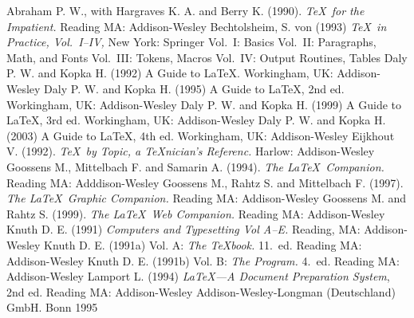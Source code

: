 \documentclass{article}
\begin{document}
\begin{thebibliography}{\hspace{1.5cm}}
 Abraham P. W., with Hargraves K. A. and Berry K. (1990).
   \textsl{\TeX\ for the Impatient.} Reading MA: Addison-Wesley
 Bechtolsheim, S. von (1993) \textsl{\TeX\ in Practice,
   Vol.\ I--IV,} New York: Springer
 Vol.\ I: Basics
 Vol.\ II: Paragraphs, Math, and Fonts
 Vol.\ III: Tokens, Macros
 Vol.\ IV: Output Routines, Tables
 Daly P. W. and Kopka H. (1992) {A Guide to \LaTeX.}
   Workingham, UK: Addison-Wesley
 Daly P. W. and Kopka H. (1995) {A Guide to \LaTeX,}
   2nd ed. Workingham, UK: Addison-Wesley
 Daly P. W. and Kopka H. (1999) {A Guide to \LaTeX,}
   3rd ed. Workingham, UK: Addison-Wesley
 Daly P. W. and Kopka H. (2003) {A Guide to \LaTeX,}
   4th ed. Workingham, UK: Addison-Wesley
 Eijkhout V. (1992). \textsl{\TeX\ by Topic, a 
   \TeX nician's Referenc.} Harlow: Addison-Wesley
 Goossens M., Mittelbach F. and Samarin A. (1994).
   \textsl{The \LaTeX\ Companion.} Reading MA: Adddison-Wesley
 Goossens M., Rahtz S. and Mittelbach F. (1997).
   \textsl{The \LaTeX\ Graphic Companion.} Reading MA: Addison-Wesley
 Goossens M. and Rahtz S. (1999).
   \textsl{The \LaTeX\ Web Companion.} Reading MA: Addison-Wesley
 Knuth D. E. (1991) \textsl{Computers and Typesetting
   Vol A--E.}  Reading, MA: Addison-Wesley
 Knuth D. E. (1991a) Vol. A: \textsl{The \TeX book.}
   11.~ed. Reading MA: Addison-Wesley
 Knuth D. E. (1991b) Vol. B: \textsl{The Program.}
   4.~ed. Reading MA: Addison-Wesley
 Lamport L. (1994) \textsl{\LaTeX---A Document
   Preparation System}, 2nd ed. Reading MA: Addison-Wesley
    Addison-Wesley-Longman (Deutschland) GmbH. Bonn 1995
\end{thebibliography}
\end{document}
